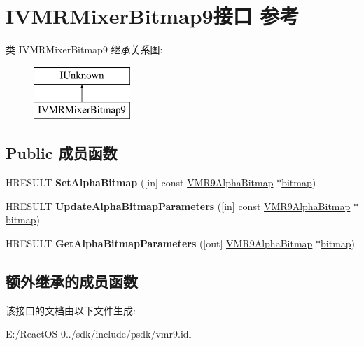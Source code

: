 \hypertarget{interface_i_v_m_r_mixer_bitmap9}{}\section{I\+V\+M\+R\+Mixer\+Bitmap9接口 参考}
\label{interface_i_v_m_r_mixer_bitmap9}
类 I\+V\+M\+R\+Mixer\+Bitmap9 继承关系图\+:\begin{figure}[H]
\begin{center}
\leavevmode
\includegraphics[height=2.000000cm]{interface_i_v_m_r_mixer_bitmap9}
\end{center}
\end{figure}
\subsection*{Public 成员函数}
\begin{DoxyCompactItemize}
\item 
\mbox{\label{interface_i_v_m_r_mixer_bitmap9_a56dfe6a449adcc78f7c1aa5af7dfeb7f}} 
H\+R\+E\+S\+U\+LT {\bfseries Set\+Alpha\+Bitmap} (\mbox{[}in\mbox{]} const \hyperlink{struct___v_m_r9_alpha_bitmap}{V\+M\+R9\+Alpha\+Bitmap} $\ast$\hyperlink{structbitmap}{bitmap})
\item 
\mbox{\label{interface_i_v_m_r_mixer_bitmap9_a6fba77427663484be5142c7f448eeb22}} 
H\+R\+E\+S\+U\+LT {\bfseries Update\+Alpha\+Bitmap\+Parameters} (\mbox{[}in\mbox{]} const \hyperlink{struct___v_m_r9_alpha_bitmap}{V\+M\+R9\+Alpha\+Bitmap} $\ast$\hyperlink{structbitmap}{bitmap})
\item 
\mbox{\label{interface_i_v_m_r_mixer_bitmap9_a25428da17f10fa4d9c66b63a6ee9619f}} 
H\+R\+E\+S\+U\+LT {\bfseries Get\+Alpha\+Bitmap\+Parameters} (\mbox{[}out\mbox{]} \hyperlink{struct___v_m_r9_alpha_bitmap}{V\+M\+R9\+Alpha\+Bitmap} $\ast$\hyperlink{structbitmap}{bitmap})
\end{DoxyCompactItemize}
\subsection*{额外继承的成员函数}


该接口的文档由以下文件生成\+:\begin{DoxyCompactItemize}
\item 
E\+:/\+React\+O\+S-\/0../sdk/include/psdk/vmr9.\+idl\end{DoxyCompactItemize}

